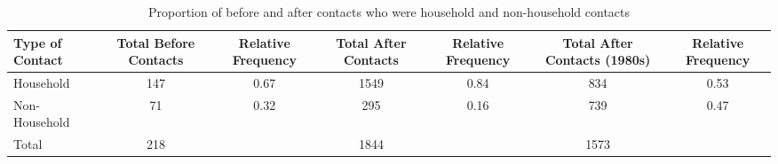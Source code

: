 
\begin{table}[h]
\begin{tabular}{lcccccc} 
\toprule
Type of Contact & Total Before Contacts & Relative Frequency &	Total After Contacts &	Relative Frequency & Total After Contacts (1980s) & Relative Frequency \\
\midrule
Household & 147 & 0.67 & 1549 &	0.84 & 834 & 0.53 \\
Non-Household &	71 & 0.32 &	295	& 0.16 & 739 & 0.47 \\
Total &	218	& &	1844 &	& 1573 & \\
\bottomrule
\end{tabular}
\caption{Proportion of before and after contacts who were household and non-household contacts}
\label{tab:table1}
\end{table}
